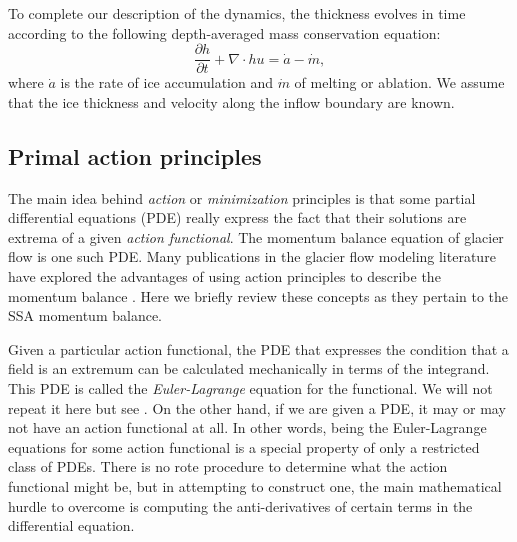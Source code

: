 \documentclass[review,oneside]{igs}
\begin{document}
To complete our description of the dynamics, the thickness evolves in time according to the following depth-averaged mass conservation equation:
\begin{equation}
    \frac{\partial h}{\partial t} + \nabla \cdot hu = \dot a - \dot m,
    \label{eq:conservation-mass}
\end{equation}
where $\dot a$ is the rate of ice accumulation and $\dot m$ of melting or ablation.
We assume that the ice thickness and velocity along the inflow boundary are known.


\subsection{Primal action principles}
\label{sec:primal-action-principles}

The main idea behind \emph{action} or \emph{minimization} principles is that some partial differential equations (PDE) really express the fact that their solutions are extrema of a given \emph{action functional}.
The momentum balance equation of glacier flow is one such PDE.
Many publications in the glacier flow modeling literature have explored the advantages of using action principles to describe the momentum balance \citep{bassis2010hamilton, dukowicz2010consistent, brinkerhoff2013data, shapero2021icepack}.
Here we briefly review these concepts as they pertain to the SSA momentum balance.

Given a particular action functional, the PDE that expresses the condition that a field is an extremum can be calculated mechanically in terms of the integrand.
This PDE is called the \emph{Euler-Lagrange} equation for the functional.
We will not repeat it here but see \citet{weinstock1974calculus}.
On the other hand, if we are given a PDE, it may or may not have an action functional at all.
In other words, being the Euler-Lagrange equations for some action functional is a special property of only a restricted class of PDEs.
There is no rote procedure to determine what the action functional might be, but in attempting to construct one, the main mathematical hurdle to overcome is computing the anti-derivatives of certain terms in the differential equation.
\end{document}
